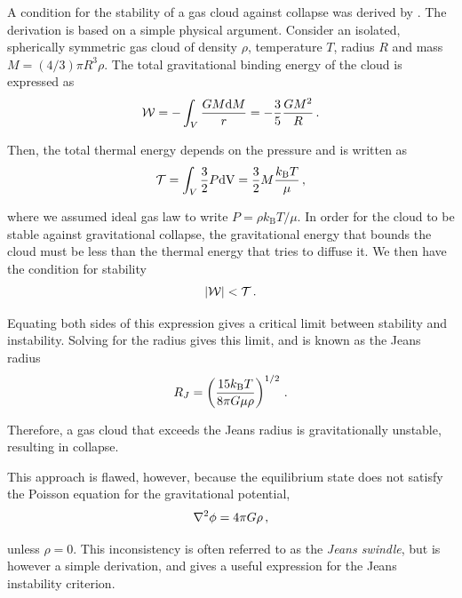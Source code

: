 A condition for the stability of a gas cloud against collapse was derived by \cite{Jeans1902}. The derivation is based on a simple physical argument. Consider an isolated, spherically symmetric gas cloud of density \(\rho\), temperature \(T\), radius \(R\) and mass \(M = (4/3)\pi R^3 \rho\). The total gravitational binding energy of the cloud is expressed as
\begin{equation}
    \mathcal{W} = - \int_V \frac{GM\upd M}{r} = - \frac{3}{5} \frac{GM^2}{R} \punct{.}
\end{equation}

Then, the total thermal energy depends on the pressure and is written as
\begin{equation}
    \mathcal{T} = \int_V \frac{3}{2} P \upd[V] = \frac{3}{2} M \frac{k_\mathrm{B} T}{\mu} \punct{,}
\end{equation}

where we assumed ideal gas law to write \(P = \rho k_\mathrm{B} T / \mu\). In order for the cloud to be stable against gravitational collapse, the gravitational energy that bounds the cloud must be less than the thermal energy that tries to diffuse it. We then have the condition for stability
\begin{equation}
    |\mathcal{W}| < \mathcal{T} \punct{.}
\end{equation}

Equating both sides of this expression gives a critical limit between stability and instability. Solving for the radius gives this limit, and is known as the Jeans radius
\begin{equation}
    R_J = \left( \frac{15 k_\mathrm{B} T}{8 \pi G \mu \rho} \right)^{1/2} \punct{.}
\end{equation}

Therefore, a gas cloud that exceeds the Jeans radius is gravitationally unstable, resulting in collapse.

This approach is flawed, however, because the equilibrium state does not satisfy the Poisson equation for the gravitational potential,
\begin{equation}
    \nabla^2 \phi = 4 \pi G \rho \punct{,}
\end{equation}

unless \(\rho = 0\). This inconsistency is often referred to as the \emph{Jeans swindle}, but is however a simple derivation, and gives a useful expression for the Jeans instability criterion.


